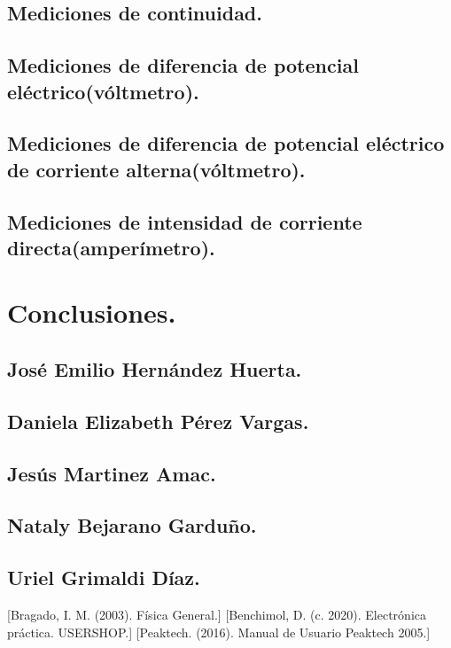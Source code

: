 \documentclass[10pt]{article}
\begin{document}
\begin{multicols}{2}
\subsection{Mediciones de continuidad.}


\subsection{Mediciones de diferencia de potencial eléctrico(vóltmetro).}


\subsection{Mediciones de diferencia de potencial eléctrico de corriente alterna(vóltmetro).}


\subsection{Mediciones de intensidad de corriente directa(amperímetro).}


\section{Conclusiones.}

\subsection*{José Emilio Hernández Huerta.}

\subsection*{Daniela Elizabeth Pérez Vargas.}

\subsection*{Jesús Martinez Amac.}

\subsection*{Nataly Bejarano Garduño.}


\subsection*{Uriel Grimaldi Díaz.}
\begin{thebibliography}{0}
	[Bragado, I. M. (2003). Física General.]
	[Benchimol, D. (c. 2020). Electrónica práctica. USERSHOP.]
	[Peaktech. (2016). Manual de Usuario Peaktech 2005.]
		
\end{thebibliography}

\end{multicols}
\end{document}
